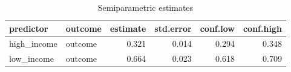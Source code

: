 \begin{table}[ht]
\centering
\begin{tabular}{llrrrr}
  \hline
predictor & outcome & estimate & std.error & conf.low & conf.high \\ 
  \hline
high\_income & outcome & 0.321 & 0.014 & 0.294 & 0.348 \\ 
  low\_income & outcome & 0.664 & 0.023 & 0.618 & 0.709 \\ 
   \hline
\end{tabular}
\caption{Semiparametric estimates} 
\label{tab:ei-estimates-exp}
\end{table}
